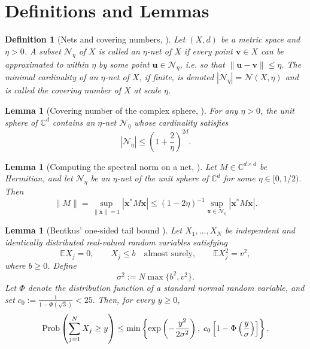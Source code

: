 \documentclass{article}
\newcommand{\C}{{\mathbb C}}
\newcommand{\E}{{\mathbb E}}
\newcommand{\calN}{{\mathcal N}}
\newcommand{\Prob}{{\rm Prob}}
\newcommand{\vx}{{\mathbf x}}
\newcommand{\vv}{{\mathbf v}}
\newcommand{\vu}{{\mathbf u}}
\newcommand{\0}{{\mathbf 0}}
\newtheorem{lemma}[theorem]{Lemma}
\newtheorem{definition}[theorem]{Definition}
\numberwithin{equation}{section}
\begin{document}
\section{Definitions and Lemmas}
\label{sec:appendix}
\begin{definition}[Nets and covering numbers,  {\cite[Definition~5.1]{vershynin2010introduction}}]
	Let $(X,d)$ be a metric space and $\eta>0$. A subset $\calN_\eta$ of $X$ is called an $\eta$-net of $X$ if every point $\vv\in X$ can be approximated to within $\eta$ by some point $\vu\in\calN_\eta$, i.e. so that $\|\vu-\vv\|\le\eta$. The minimal cardinality of an $\eta$-net of $X$, if finite, is denoted $|\calN_\eta|=\calN(X,\eta)$ and is called the covering number of $X$ at scale $\eta$.
\end{definition}
\begin{lemma}[Covering number of the complex sphere, {\cite[Lemma~14]{kopel2020random}}]
	\label{appendix_lem:lem5.2}
	For any $\eta>0$, the unit sphere of $\C^d$ contains an $\eta$-net $\calN_\eta$ whose cardinality satisfies
	\[|\calN_\eta|\le\left(1+\frac{2}{\eta}\right)^{2d}.\]
\end{lemma}
\begin{lemma}[Computing the spectral norm on a net, {\cite[ Lemma~5.4]{vershynin2010introduction}}]
	\label{appendix_lem:lem5.4}
	Let $M\in\C^{d\times d}$ be Hermitian, and let $\calN_\eta$ be an $\eta$-net of the unit sphere of $\C^d$ for some $\eta\in[0,1/2)$.
	Then
	\[\|M\|=\sup_{\|\vx\|=1}|\vx^*M\vx|\le(1-2\eta)^{-1}\sup_{\vx\in\calN_\eta}|\vx^*M\vx|.\]
\end{lemma}
\begin{lemma}[Bentkus' one-sided tail bound
	{\cite[Theorem~1]{bentkus2003inequality}}]
	\label{lem:bentkus_one_sided}
	Let $X_1,\ldots,X_N$ be independent and identically
	distributed real-valued random variables satisfying
	\[
	\E X_j=0,\qquad X_j\le b\quad\text{almost surely},\qquad
	\E X_j^2=v^2,
	\]
	where $b\ge0$. Define
	\[	\sigma^2:=N\max\{b^2,v^2\}.\]
	Let $\Phi$ denote the distribution function of a standard normal random variable, and set
	$ c_0:=	\frac{1}{1-\Phi(\sqrt3)}<25.$
	Then, for every $y\ge0$,
	\[
	\Prob\left(\sum_{j=1}^N X_j\ge y\right)\le\min\left\{
	\exp\left(-\frac{y^2}{2\sigma^2}\right),\;	c_0\left[
	1-\Phi\left(\frac{y}{\sigma}\right)	\right]\right\}.
	\]
\end{lemma}

{
	
	
}
\end{document}
